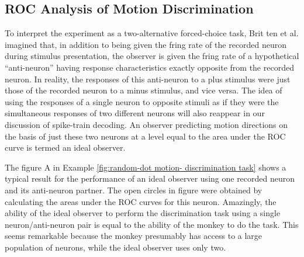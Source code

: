\subsection{ROC Analysis of Motion Discrimination}
\begin{rem}
  To interpret the experiment as a two-alternative forced-choice task, Brit
ten et al. imagined that, in addition to being given the fring rate of the
recorded neuron during stimulus presentation, the observer is given the
fring rate of a hypothetical “anti-neuron” having response
characteristics exactly opposite from the recorded neuron.
 In reality, the responses of this
anti-neuron to a plus stimulus were just those of the recorded neuron to a
minus stimulus, and vice versa. The idea of using the responses of a single
neuron to opposite stimuli as if they were the simultaneous responses of
two different neurons will also reappear in our discussion of spike-train decoding. An observer predicting motion directions on the basis of just these
two neurons at a level equal to the area under the ROC curve is termed an
ideal observer.
\end{rem}
\begin{rem}
   The figure A in Example \ref{fig:random-dot motion-
discrimination task} shows a typical result for the performance of an ideal observer
using one recorded neuron and its anti-neuron partner. The open circles in
figure were obtained by calculating the areas under the ROC curves
for this neuron. Amazingly, the ability of the ideal observer to perform
the discrimination task using a single neuron/anti-neuron pair is equal to
the ability of the monkey to do the task. This seems
remarkable because the monkey presumably has access to a large
population of neurons, while the ideal observer uses only two. 
\end{rem}



